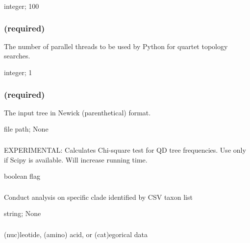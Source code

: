 \documentclass[letterpaper,12pt,english]{sphinxmanual}
\begin{document}
 integer;  100


\subsubsection{ (required)}
\label{\detokenize{prog_desc:threads-number-of-threads-required}}
 The number of parallel threads to be used by Python for quartet topology searches.

 integer;  1


\subsubsection{ (required)}
\label{\detokenize{prog_desc:tree-required}}
 The input tree in Newick (parenthetical) format.

 file path;  None


\subsubsection{}
\label{\detokenize{prog_desc:calc-qdstats}}
 EXPERIMENTAL: Calculates Chi-square test for QD tree frequencies. Use only  if Scipy is available. Will increase running time.

 boolean flag


\subsubsection{}
\label{\detokenize{prog_desc:clade}}
 Conduct analysis on specific clade identified by CSV taxon list

 string;  None


\subsubsection{}
\label{\detokenize{prog_desc:data-type}}
 (nuc)leotide, (amino) acid, or (cat)egorical data
\end{document}
